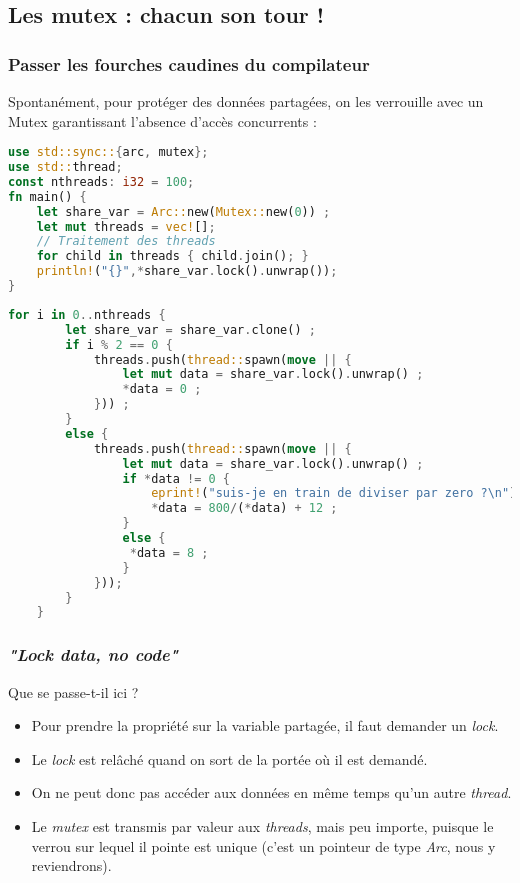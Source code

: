 \subsection{Les mutex : chacun son tour !}
\begin{frame}[fragile]
  \frametitle{Passer les fourches caudines du compilateur}
Spontanément, pour protéger des données partagées, on les verrouille avec un Mutex garantissant l'absence d'accès concurrents :
\begin{lstlisting}[language=rust, basicstyle=\tiny{}]
use std::sync::{arc, mutex};
use std::thread;
const nthreads: i32 = 100;
fn main() {
    let share_var = Arc::new(Mutex::new(0)) ;
    let mut threads = vec![];
    // Traitement des threads
    for child in threads { child.join(); }
    println!("{}",*share_var.lock().unwrap());
}
\end{lstlisting}
\end{frame}
\begin{frame}[fragile]
  \begin{lstlisting}[language=rust, basicstyle=\tiny{}]
    for i in 0..nthreads {
        let share_var = share_var.clone() ;
        if i % 2 == 0 {
            threads.push(thread::spawn(move || {
                let mut data = share_var.lock().unwrap() ;
                *data = 0 ;
            })) ;
        }
        else {
            threads.push(thread::spawn(move || {
                let mut data = share_var.lock().unwrap() ;
                if *data != 0 {
                    eprint!("suis-je en train de diviser par zero ?\n");
                    *data = 800/(*data) + 12 ;
                }
                else {
                 *data = 8 ;
                }
            }));
        }
    }
  \end{lstlisting}
\end{frame}
\begin{frame}[fragile]
  \frametitle{\textit{"Lock data, no code"}}
Que se passe-t-il ici ?
\begin{itemize}
\item Pour prendre la propriété sur la variable partagée, il faut demander un \textit{lock}.
\item Le \textit{lock} est relâché quand on sort de la portée où il est demandé.
\item On ne peut donc pas accéder aux données en même temps qu'un autre \textit{thread}.
\item Le \textit{mutex} est transmis par valeur aux \textit{threads}, mais peu importe, puisque le verrou sur lequel il pointe est unique (c'est un pointeur de type \textit{Arc}, nous y reviendrons).
\end{itemize}
\end{frame}
